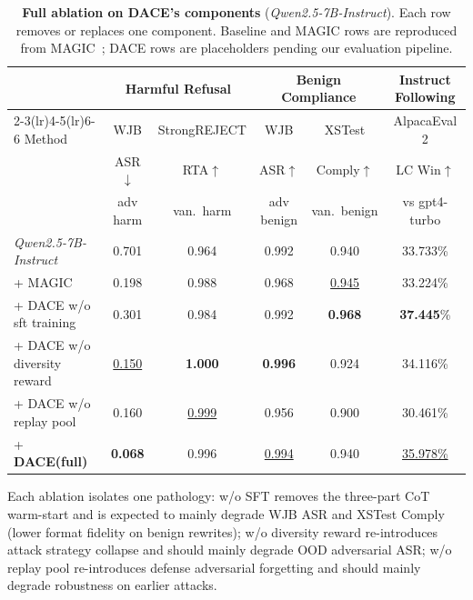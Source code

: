 \documentclass{article}
\newcommand{\method}{\textsc{DACE}\xspace}
\begin{document}
\begin{table}[ht]
\centering
\caption{\textbf{Full ablation on \method's components} (\textit{Qwen2.5-7B-Instruct}). Each row removes or replaces one component. Baseline and MAGIC rows are reproduced from MAGIC~\citep{magic2025}; \method rows are placeholders pending our evaluation pipeline.}
\label{tab:ablation-full}
\setlength{\tabcolsep}{0.5pt}
\renewcommand{\arraystretch}{1.15}
\scriptsize
\begin{tabular}{lccccc}
\toprule
& \multicolumn{2}{c}{Harmful Refusal} & \multicolumn{2}{c}{Benign Compliance} & Instruct Following \\
\cmidrule(lr){2-3}\cmidrule(lr){4-5}\cmidrule(lr){6-6}
Method & WJB & StrongREJECT & WJB & XSTest & AlpacaEval 2 \\
 & ASR$\downarrow$ & RTA$\uparrow$ & ASR$\uparrow$ & Comply$\uparrow$ & LC Win$\uparrow$ \\
 & adv harm & van.\ harm & adv benign & van.\ benign & vs gpt4-turbo \\
\midrule
\textit{Qwen2.5-7B-Instruct}            & 0.701 & 0.964 & 0.992 & 0.940 & 33.733\% \\
\quad + MAGIC                           & 0.198 & 0.988 & 0.968 & \underline{0.945} & 33.224\% \\
\quad + \method w/o sft training        & 0.301 & 0.984 & 0.992 & \textbf{0.968} & \textbf{37.445}\% \\
\quad + \method w/o diversity reward    & \underline{0.150} & \textbf{1.000} & \textbf{0.996} & 0.924 & 34.116\% \\
\quad + \method w/o replay pool         & 0.160 & \underline{0.999} & 0.956 & 0.900 & 30.461\% \\
\cellcolor{cyan!15}\quad + \textbf{\method (full)} & \cellcolor{cyan!15}\textbf{0.068} & \cellcolor{cyan!15}0.996 & \cellcolor{cyan!15}\underline{0.994} & \cellcolor{cyan!15}0.940 & \cellcolor{cyan!15}\underline{35.978\%} \\
\bottomrule
\end{tabular}
\end{table}

Each ablation isolates one pathology: w/o SFT removes the three-part CoT warm-start and is expected to mainly degrade WJB ASR and XSTest Comply (lower format fidelity on benign rewrites); w/o diversity reward re-introduces attack strategy collapse and should mainly degrade OOD adversarial ASR; w/o replay pool re-introduces defense adversarial forgetting and should mainly degrade robustness on earlier attacks.
\end{document}
